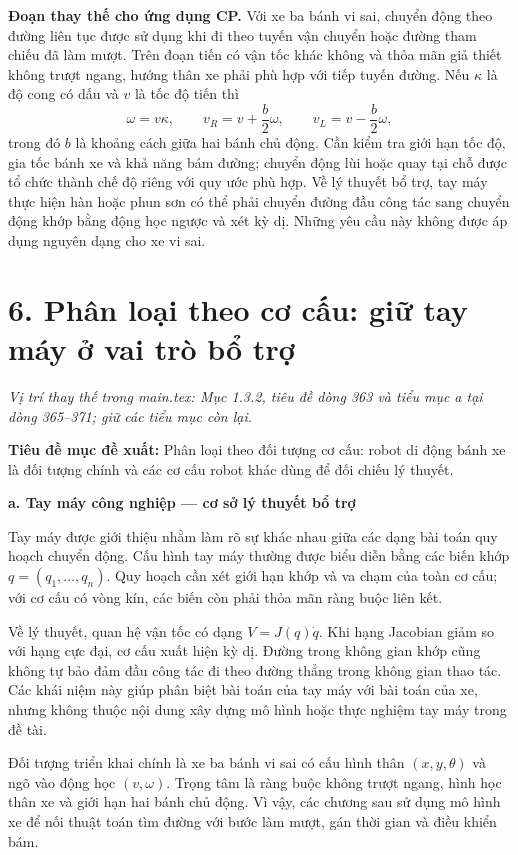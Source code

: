 \documentclass[12pt,a4paper,oneside]{report}
\newcommand{\vitri}[1]{\par\noindent\textit{Vị trí thay thế trong main.tex: #1.}\par}
\begin{document}
\noindent\textbf{Đoạn thay thế cho ứng dụng CP.} Với xe ba bánh vi sai, chuyển động theo đường liên tục được sử dụng khi đi theo tuyến vận chuyển hoặc đường tham chiếu đã làm mượt. Trên đoạn tiến có vận tốc khác không và thỏa mãn giả thiết không trượt ngang, hướng thân xe phải phù hợp với tiếp tuyến đường. Nếu \(\kappa\) là độ cong có dấu và \(v\) là tốc độ tiến thì
\[
  \omega=v\kappa,\qquad
  v_R=v+\frac b2\omega,\qquad
  v_L=v-\frac b2\omega,
\]
trong đó \(b\) là khoảng cách giữa hai bánh chủ động. Cần kiểm tra giới hạn tốc độ, gia tốc bánh xe và khả năng bám đường; chuyển động lùi hoặc quay tại chỗ được tổ chức thành chế độ riêng với quy ước phù hợp. Về lý thuyết bổ trợ, tay máy thực hiện hàn hoặc phun sơn có thể phải chuyển đường đầu công tác sang chuyển động khớp bằng động học ngược và xét kỳ dị. Những yêu cầu này không được áp dụng nguyên dạng cho xe vi sai.

\section*{6. Phân loại theo cơ cấu: giữ tay máy ở vai trò bổ trợ}
\vitri{Mục 1.3.2, tiêu đề dòng 363 và tiểu mục a tại dòng 365--371; giữ các tiểu mục còn lại}

\noindent\textbf{Tiêu đề mục đề xuất:} Phân loại theo đối tượng cơ cấu: robot di động bánh xe là đối tượng chính và các cơ cấu robot khác dùng để đối chiếu lý thuyết.

\noindent\textbf{a. Tay máy công nghiệp --- cơ sở lý thuyết bổ trợ}

Tay máy được giới thiệu nhằm làm rõ sự khác nhau giữa các dạng bài toán quy hoạch chuyển động. Cấu hình tay máy thường được biểu diễn bằng các biến khớp \(q=(q_1,\ldots,q_n)\). Quy hoạch cần xét giới hạn khớp và va chạm của toàn cơ cấu; với cơ cấu có vòng kín, các biến còn phải thỏa mãn ràng buộc liên kết.

Về lý thuyết, quan hệ vận tốc có dạng \(V=J(q)\dot q\). Khi hạng Jacobian giảm so với hạng cực đại, cơ cấu xuất hiện kỳ dị. Đường trong không gian khớp cũng không tự bảo đảm đầu công tác đi theo đường thẳng trong không gian thao tác. Các khái niệm này giúp phân biệt bài toán của tay máy với bài toán của xe, nhưng không thuộc nội dung xây dựng mô hình hoặc thực nghiệm tay máy trong đề tài.

Đối tượng triển khai chính là xe ba bánh vi sai có cấu hình thân \((x,y,\theta)\) và ngõ vào động học \((v,\omega)\). Trọng tâm là ràng buộc không trượt ngang, hình học thân xe và giới hạn hai bánh chủ động. Vì vậy, các chương sau sử dụng mô hình xe để nối thuật toán tìm đường với bước làm mượt, gán thời gian và điều khiển bám.
\end{document}
